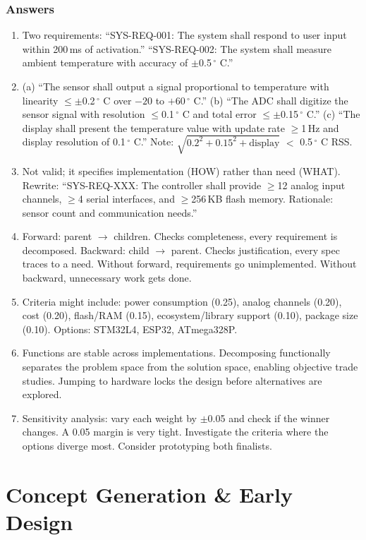 \documentclass[11pt,letterpaper,twoside,openany]{book}
\begin{document}
\subsection{Answers}
\begin{enumerate}[leftmargin=1.5em]
\item Two requirements: ``SYS-REQ-001: The system shall respond to user input within 200\,ms of activation.'' ``SYS-REQ-002: The system shall measure ambient temperature with accuracy of $\pm$0.5\,$^{\circ}$ C.''
\item (a) ``The sensor shall output a signal proportional to temperature with linearity $\leq \pm$0.2\,$^{\circ}$ C over $-20$ to $+60$\,$^{\circ}$ C.'' (b) ``The ADC shall digitize the sensor signal with resolution $\leq$0.1\,$^{\circ}$ C and total error $\leq \pm$0.15\,$^{\circ}$ C.'' (c) ``The display shall present the temperature value with update rate $\geq$1\,Hz and display resolution of 0.1\,$^{\circ}$ C.'' Note: $\sqrt{0.2^2+0.15^2+\text{display}}$ $<$ 0.5\,$^{\circ}$ C RSS.
\item Not valid; it specifies implementation (HOW) rather than need (WHAT). Rewrite: ``SYS-REQ-XXX: The controller shall provide $\geq$12 analog input channels, $\geq$4 serial interfaces, and $\geq$256\,KB flash memory. Rationale: sensor count and communication needs.''
\item Forward: parent $\to$ children. Checks completeness, every requirement is decomposed. Backward: child $\to$ parent. Checks justification, every spec traces to a need. Without forward, requirements go unimplemented. Without backward, unnecessary work gets done.
\item Criteria might include: power consumption (0.25), analog channels (0.20), cost (0.20), flash/RAM (0.15), ecosystem/library support (0.10), package size (0.10). Options: STM32L4, ESP32, ATmega328P.
\item Functions are stable across implementations. Decomposing functionally separates the problem space from the solution space, enabling objective trade studies. Jumping to hardware locks the design before alternatives are explored.
\item Sensitivity analysis: vary each weight by $\pm$0.05 and check if the winner changes. A 0.05 margin is very tight. Investigate the criteria where the options diverge most. Consider prototyping both finalists.
\end{enumerate}

\chapter{Concept Generation \& Early Design}\label{ch:concept}
\end{document}
